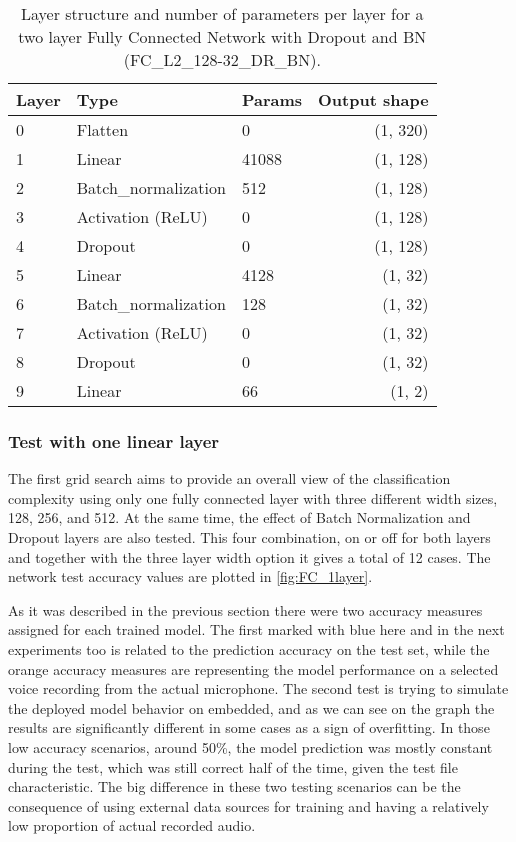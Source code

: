 \begin{table}[h]
\centering
\begin{tabular}{lllr}
\hline
\textbf{Layer} & \textbf{Type}  & \textbf{Params} & \textbf{Output shape} \\
\hline
0     & Flatten              & 0      & (1, 320)     \\
1     & Linear               & 41088  & (1, 128)     \\
2     & Batch\_normalization & 512    & (1, 128)     \\
3     & Activation (ReLU)    & 0      & (1, 128)     \\
4     & Dropout              & 0      & (1, 128)     \\
5     & Linear               & 4128   & (1, 32)      \\
6     & Batch\_normalization & 128    & (1, 32)      \\
7     & Activation (ReLU)    & 0      & (1, 32)      \\
8     & Dropout              & 0      & (1, 32)      \\
9     & Linear               & 66     & (1, 2) \\
\hline
\end{tabular}
\caption{Layer structure and number of parameters per layer for a two layer Fully Connected Network with Dropout and BN (FC\_L2\_128-32\_DR\_BN). }
\label{tab:FC_2layer}
\end{table}


\subsubsection{Test with one linear layer}

The first grid search aims to provide an overall view of the classification complexity using only one fully connected layer with three different width sizes, 128, 256, and 512. At the same time, the effect of Batch Normalization and Dropout layers are also tested. This four combination, on or off for both layers and together with the three layer width option it gives a total of 12 cases. The network test accuracy values are plotted in \autoref{fig:FC_1layer}.

As it was described in the previous section there were two accuracy measures assigned for each trained model. The first marked with blue here and in the next experiments too is related to the prediction accuracy on the test set, while the orange accuracy measures are representing the model performance on a selected voice recording from the actual microphone. The second test is trying to simulate the deployed model behavior on embedded, and as we can see on the graph the results are significantly different in some cases as a sign of overfitting. In those low accuracy scenarios, around 50\%, the model prediction was mostly constant during the test, which was still correct half of the time, given the test file characteristic. The big difference in these two testing scenarios can be the consequence of using external data sources for training and having a relatively low proportion of actual recorded audio.

